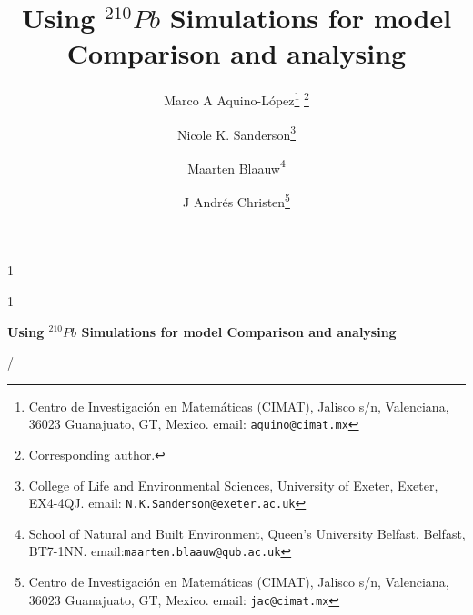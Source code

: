 \documentclass [11pt] {article}
\date{ }
\newcommand{\blind}{1}
\newcommand{\papertitle}{Using $^{210}Pb$ Simulations for model Comparison and analysing}
\begin{document}
	\def\spacingset#1{\renewcommand{\baselinestretch}%
		{#1}\small\normalsize} \spacingset{1}
	\blind
	{
		\title{\textbf{\papertitle}}

		\author{Marco A Aquino-L\'opez\thanks{
				Centro de Investigaci\'on en Matem\'aticas (CIMAT),
				Jalisco s/n, Valenciana, 36023 Guanajuato, GT, Mexico.
				email: \texttt{aquino@cimat.mx} } \thanks{Corresponding author.}
					\and
			Nicole K. Sanderson\thanks{
				College of Life and Environmental Sciences, University of Exeter,
				Exeter, EX4-4QJ.
				email: \texttt{N.K.Sanderson@exeter.ac.uk}}
					\and
			Maarten Blaauw\thanks{School of Natural and Built Environment,
				Queen's University Belfast,
				Belfast, BT7-1NN.
				email:\texttt{maarten.blaauw@qub.ac.uk}  }
					\and
			J Andr\'es Christen\thanks{
				Centro de Investigaci\'on en Matem\'aticas (CIMAT),
				Jalisco s/n, Valenciana, 36023 Guanajuato, GT, Mexico.
				email: \texttt{jac@cimat.mx}  }
			}
		\maketitle
	} \fi

	\blind
	{
		\bigskip
		\bigskip
		\bigskip
		\begin{center}
			{\LARGE\bf \papertitle}
		\end{center}
		\medskip/
	} \fi
\end{document}
